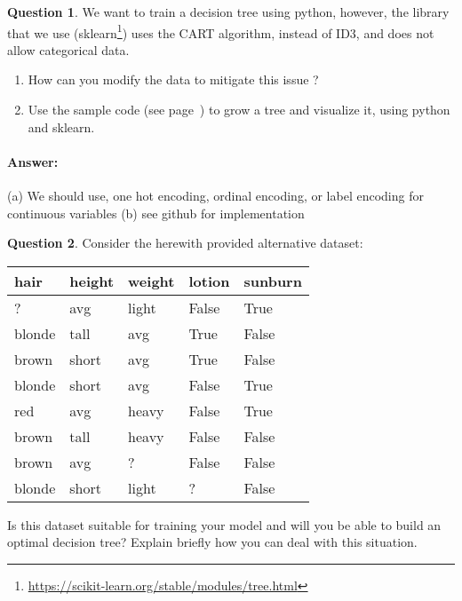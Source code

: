 \documentclass[11pt,a4paper]{article}
\theoremstyle{definition}%
\newtheorem{Q}{Question}[] %
\newcommand{\reponse}[1]{%
\ifthenelse {\boolean{corrige}} {\paragraph{Answer:} \color{darkblue}   #1\color{black}} {}
}
\begin{document}
\begin{Q}
    We want to train a decision tree using python, however, the library that we use 
    (sklearn\footnote{\url{https://scikit-learn.org/stable/modules/tree.html}}) uses
    the CART algorithm, instead of ID3, and does not allow categorical data.
    \begin{enumerate}
        \item How can you modify the data to mitigate this issue ?
        \item Use the sample code (see page~\pageref{source}) to grow a tree and visualize it, using python and sklearn.
    \end{enumerate}
    \reponse{
        (a) We should use, one hot encoding, ordinal encoding, or label encoding for continuous variables
        (b) see github for implementation
    }
\end{Q}

\begin{Q}
    Consider the herewith provided alternative dataset:
    \begin{center}
\begin{tabular}{|l|l|l|l|l|}
\hline
\textbf{hair} & \textbf{height} & \textbf{weight} & \textbf{lotion} & \textbf{sunburn} \\ \hline
?             & avg             & light           & False           & True             \\ \hline
blonde        & tall            & avg             & True            & False            \\ \hline
brown         & short           & avg             & True            & False            \\ \hline
blonde        & short           & avg             & False           & True             \\ \hline
red           & avg             & heavy           & False           & True             \\ \hline
brown         & tall            & heavy           & False           & False            \\ \hline
brown         & avg             & ?               & False           & False            \\ \hline
blonde        & short           & light           & ?               & False            \\ \hline
\end{tabular}
    \end{center}
    
    Is this dataset suitable for training your model and will you be able to build an optimal decision
    tree? Explain briefly how you can deal with this situation.
\end{Q}
\end{document}
